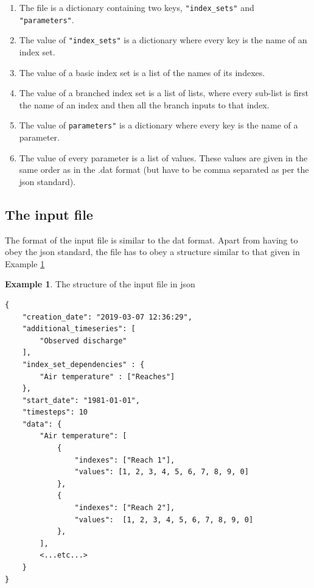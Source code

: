 \documentclass[11pt]{article}
\theoremstyle{definition}
\newtheorem{myexample}{Example}
\newenvironment{example}%
  {\begin{lrbox}{\examplebox}%
   \begin{minipage}{\dimexpr\linewidth-2\fboxsep}
   \begin{myexample}}%
  {\end{myexample}%
   \end{minipage}%
   \end{lrbox}%
   \begin{trivlist}
     \item[]\colorbox{silver}{\usebox\examplebox}
   \end{trivlist}}
\begin{document}
\begin{enumerate}[i]
\item The file is a dictionary containing two keys, {\tt "index\_sets"} and {\tt "parameters"}.
\item The value of {\tt "index\_sets"} is a dictionary where every key is the name of an index set.
\item The value of a basic index set is a list of the names of its indexes.
\item The value of a branched index set is a list of lists, where every sub-list is first the name of an index and then all the branch inputs to that index.
\item The value of {\tt parameters"} is a dictionary where every key is the name of a parameter.
\item The value of every parameter is a list of values. These values are given in the same order as in the .dat format (but have to be comma separated as per the json standard).
\end{enumerate}

\subsection{The input file}
The format of the input file is similar to the dat format. Apart from having to obey the json standard, the file has to obey a structure similar to that given in Example \ref{ex:jsonin}

\begin{example}\label{ex:jsonin}
The structure of the input file in json
\begin{lstlisting}
{
	"creation_date": "2019-03-07 12:36:29",
	"additional_timeseries": [
		"Observed discharge"
	],
	"index_set_dependencies" : {
		"Air temperature" : ["Reaches"]
	},
	"start_date": "1981-01-01",
	"timesteps": 10
	"data": {
		"Air temperature": [
			{
				"indexes": ["Reach 1"],
				"values": [1, 2, 3, 4, 5, 6, 7, 8, 9, 0]
			},
			{
				"indexes": ["Reach 2"],
				"values":  [1, 2, 3, 4, 5, 6, 7, 8, 9, 0]
			},
		],
		<...etc...>
	}
}
\end{lstlisting}
\end{example}
\end{document}
